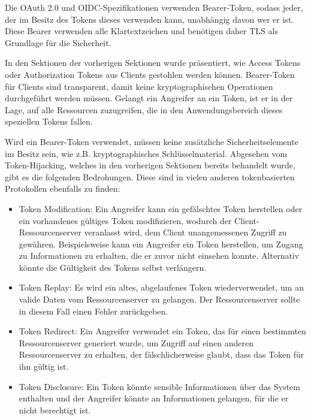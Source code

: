 Die OAuth 2.0 und OIDC-Spezifikationen verwenden Bearer-Token, sodass jeder, der im Besitz des Tokens dieses verwenden kann, unabhängig davon wer er ist. Diese Bearer verwenden alle Klartextzeichen und benötigen daher TLS als Grundlage für die Sicherheit. \cite{OAuthAuthorizationSecurityConsiderations}

In den Sektionen der vorherigen Sektionen wurde präsentiert, wie Access Tokens oder Authorization Tokens aus Clients gestohlen werden können. Bearer-Token für Clients sind transparent, damit keine kryptographischen Operationen durchgeführt werden müssen. Gelangt ein Angreifer an ein Token, ist er in der Lage, auf alle Ressourcen zuzugreifen, die in den Anwendungsbereich dieses speziellen Tokens fallen.

Wird ein Bearer-Token verwendet, müssen keine zusätzliche Sicherheitselemente im Besitz sein, wie z.B. kryptographisches Schlüsselmaterial. Abgesehen vom Token-Hijacking, welches in den vorherigen Sektionen bereits behandelt wurde, gibt es die folgenden Bedrohungen. Diese sind in vielen anderen tokenbasierten Protokollen ebenfalls zu finden:

\begin{itemize}
	\item Token Modification: Ein Angreifer kann ein gefälschtes Token herstellen oder ein vorhandenes gültiges Token modifizieren, wodurch der Client-Ressourcenserver veranlasst wird, dem Client unangemessenen Zugriff zu gewähren. Beispielsweise kann ein Angreifer ein Token herstellen, um Zugang zu Informationen zu erhalten, die er zuvor nicht einsehen konnte. Alternativ könnte die Gültigkeit des Tokens selbst verlängern. \cite{RFC6750}
	
	\item Token Replay: Es wird ein altes, abgelaufenes Token wiederverwendet, um an valide Daten vom Ressourcenserver zu gelangen. Der Ressourcenserver sollte in diesem Fall einen Fehler zurückgeben. \cite{RFC6750}
	
	\item Token Redirect: Ein Angreifer verwendet ein Token, das für einen bestimmten Ressourcenserver generiert wurde, um Zugriff auf einen anderen Ressourcenserver zu erhalten, der fälschlicherweise glaubt, dass das Token für ihn gültig ist. \cite{RFC6750}
	
	\item Token Disclosure: Ein Token könnte sensible Informationen über das System enthalten und der Angreifer könnte an Informationen gelangen, für die er nicht berechtigt ist. \cite{RFC6750}
\end{itemize}

